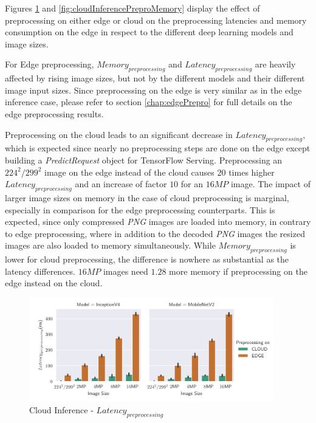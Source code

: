 Figures \ref{fig:cloudInferencePreproLat} and \ref{fig:cloudInferencePreproMemory} display the effect of preprocessing on either edge or cloud on the preprocessing latencies and memory consumption on the edge in respect to the different deep learning models and image sizes.

For Edge preprocessing, $Memory_{preprocessing}$ and $Latency_{preprocessing}$ are heavily affected by rising image sizes, but not by the different models and their different image input sizes.
Since preprocessing on the edge is very similar as in the edge inference case, please refer to section \ref{chap:edgePrepro} for full details on the edge preprocessing results.

Preprocessing on the cloud leads to an significant decrease in $Latency_{preprocessing}$, which is expected since nearly no preprocessing steps are done on the edge except building a \emph{PredictRequest} object for TensorFlow Serving.
Preprocessing an $224^2/299^2$ image on the edge instead of the cloud causes $20$ times higher $Latency_{preprocessing}$ and an increase of factor $10$ for an $16MP$ image.
The impact of larger image sizes on memory in the case of cloud preprocessing is marginal, especially in comparison for the edge preprocessing counterparts. This is expected, since only compressed \emph{PNG} images are loaded into memory, in contrary to edge preprocessing, where in addition to the decoded \emph{PNG} images the resized images are also loaded to memory simultaneously.
While $Memory_{preprocessing}$ is lower for cloud preprocessing, the difference is nowhere as substantial as the latency differences. $16MP$ images need $1.28$ more memory if preprocessing on the edge instead on the cloud.

\begin{figure}[H]
\centering
\includegraphics[width=0.95\textwidth]{./Bilder/single_plots/cloud_inference_plots/Cloud_Inference_Preprocessing_Latency.pdf}
\caption{Cloud Inference -  $Latency_{preprocessing}$}
\label{fig:cloudInferencePreproLat}
\end{figure}




